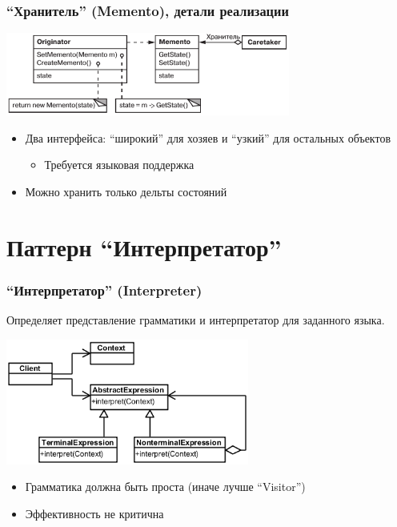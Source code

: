 \documentclass[xetex,mathserif,serif]{beamer}
\begin{document}
	\begin{frame}
		\frametitle{``Хранитель'' (Memento), детали реализации}
		\begin{center}
			\includegraphics[width=0.7\textwidth]{memento.png}
		\end{center}
		\begin{itemize}
			\item Два интерфейса: ``широкий'' для хозяев и ``узкий'' для остальных объектов
			\begin{itemize}
				\item Требуется языковая поддержка
			\end{itemize}
			\item Можно хранить только дельты состояний
		\end{itemize}
	\end{frame}

	\section{Паттерн ``Интерпретатор''}

	\begin{frame}
		\frametitle{``Интерпретатор'' (Interpreter)}
		Определяет представление грамматики и интерпретатор для заданного языка.
		\begin{center}
			\includegraphics[width=0.6\textwidth]{interpreter.png}
		\end{center}
		\begin{itemize}
			\item Грамматика должна быть проста (иначе лучше ``Visitor'')
			\item Эффективность не критична
		\end{itemize}
	\end{frame}
\end{document}
